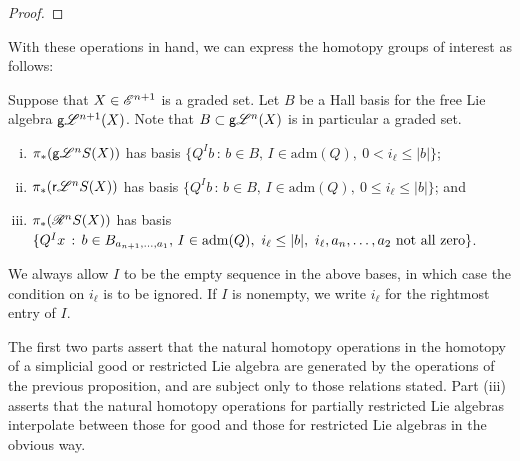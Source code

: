 \documentclass[11pt]{article}
\newcommand{\GS}[1]{\scrE^{#1}}
\newcommand{\RestLie}[1]{\mathsf{r}{\scrL}^{#1}}%
\newcommand{\GoodLie}[1]{\mathsf{g}{\scrL}^{#1}}%
\newcommand{\PRLie}[1]{\scrR^{#1}}%
\newcommand{\produces}[1]{\overset{#1}{\rightsquigarrow}}
\newcommand{\admis}[1]{\mathrm{adm}(#1)}%
\newcommand{\Fr}[1]{#1}%
\newcommand{\LambdaOp}{Q}
\begin{document}
\begin{CategoriesOfInterest}
\begin{proof}
\end{proof}
With these operations in hand, we can express the homotopy groups of interest as follows:
\begin{prop*}
Suppose that $X\in\GS{n+1}$ is a graded set. Let $B$ be a Hall basis for the free Lie algebra $\Fr{\GoodLie{n+1}}(X)$. Note that $B\subset \Fr{\GoodLie{n}}(X)$ is in particular a graded set.
\begin{enumerate}[i)]\squishlist
\setlength{\parindent}{.25in}
\item $\pi_*(\Fr{\GoodLie{n}}S(X))$ has basis $\{\LambdaOp^Ib\,:\,b\in B,\,I\in\admis{\LambdaOp},\ 0<i_\ell\leq|b|\}$;
\item $\pi_*(\Fr{\RestLie{n}}S(X))$ has basis $\{\LambdaOp^Ib\,:\,b\in B,\,I\in\admis{\LambdaOp},\ 0\leq i_\ell\leq|b|\}$; and
\item $\pi_*(\Fr{\PRLie{n}}S(X))$ has basis $\{\LambdaOp^Ix\,:\,b\in B_{a_{n+1},\ldots,a_1},\,I\in\admis{\LambdaOp},\ i_\ell\leq|b|,\ i_\ell,a_{n},\ldots,a_2\textup{ not all zero}\}$.
\end{enumerate}
We always allow $I$ to be the empty sequence in the above bases, in which case the condition on $i_{\ell}$ is to be ignored. If $I$ is nonempty, we write $i_{\ell}$ for the rightmost entry of $I$.
\end{prop*}
The first two parts assert that the natural homotopy operations in the homotopy of a simplicial good or restricted Lie algebra are generated by the operations of the previous proposition, and are subject only to those relations stated. Part (iii) asserts that the natural homotopy operations for partially restricted Lie algebras interpolate between those for good and those for restricted Lie algebras in the obvious way.


\end{CategoriesOfInterest}
\end{document}
